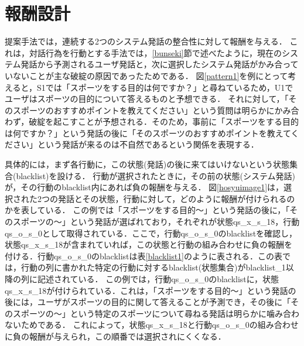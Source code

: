 \documentclass[12pt,a4paper,twoside,openany]{jbook}
\begin{document}
\section{報酬設計}\label{hosyu}
提案手法では，連続する2つのシステム発話の整合性に対して報酬を与える．
これは，対話行為を行動とする手法では，\ref{bunseki}節で述べたように，現在のシステム発話から予測されるユーザ発話と，次に選択したシステム発話がかみ合っていないことが主な破綻の原因であったためである．
図\ref{pattern1}を例にとって考えると，S1では「スポーツをする目的は何ですか？」と尋ねているため，U1でユーザはスポーツの目的について答えるものと予想できる．
それに対して，「そのスポーツのおすすめポイントを教えてください」という質問は明らかにかみ合わず，破綻を起こすことが予想される．そのため，事前に「スポーツをする目的は何ですか？」という発話の後に「そのスポーツのおすすめポイントを教えてください」という発話が来るのは不自然であるという関係を表現する．

具体的には，まず各行動に，この状態(発話)の後に来てはいけないという状態集合(blacklist)を設ける．
行動が選択されたときに，その前の状態(システム発話)が，その行動のblacklist内にあれば負の報酬を与える．
図\ref{hosyuimage1}は，選択された2つの発話とその状態，行動に対して，どのように報酬が付けられるのかを表している．
この例では「スポーツをする目的〜」という発話の後に，「そのスポーツの〜」という発話が選ばれており，それぞれが状態qs\_x\_s\_18，行動qs\_o\_s\_0として取得されている．ここで，行動qs\_o\_s\_0のblacklistを確認し，状態qs\_x\_s\_18が含まれていれば，この状態と行動の組み合わせに負の報酬を付ける．行動qs\_o\_s\_0のblacklistは表\ref{blacklist1}のように表される．この表では，行動の列に書かれた特定の行動に対するblacklist(状態集合)がblacklist\_1以降の列に記述されている．
この例では，行動qs\_o\_s\_0のblacklistに，状態qs\_x\_s\_18が付けられている．これは，「スポーツをする目的〜」という発話の後には，ユーザがスポーツの目的に関して答えることが予測でき，その後に「そのスポーツの〜」という特定のスポーツについて尋ねる発話は明らかに噛み合わないためである．
これによって，状態qs\_x\_s\_18と行動qs\_o\_s\_0の組み合わせに負の報酬が与えられ，この順番では選択されにくくなる．

\end{document}
